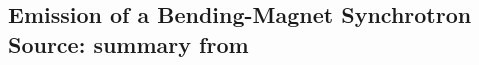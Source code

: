 



\subsection{Emission of a Bending-Magnet Synchrotron Source: summary from \cite{SanchezdelRioPadmore2024}}

